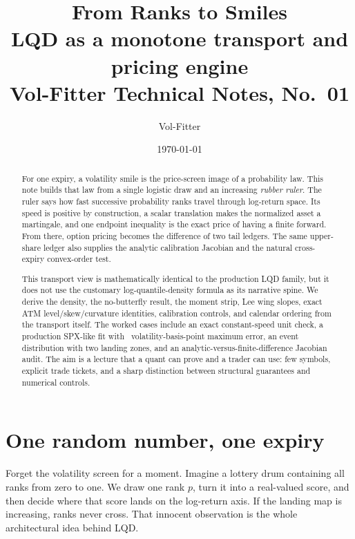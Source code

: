 \documentclass[11pt]{article}
\title{\textbf{From Ranks to Smiles}\\[2pt]
\large LQD as a monotone transport and pricing engine\\[2pt]
\normalsize Vol-Fitter Technical Notes, No.~01}
\author{Vol-Fitter}
\date{\today}
\begin{document}
\maketitle



\begin{abstract}
For one expiry, a volatility smile is the price-screen image of a probability
law.  This note builds that law from a single logistic draw and an increasing
\emph{rubber ruler}.  The ruler says how fast successive probability ranks
travel through log-return space.  Its speed is positive by construction, a
scalar translation makes the normalized asset a martingale, and one endpoint
inequality is the exact price of having a finite forward.  From there, option
pricing becomes the difference of two tail ledgers.  The same upper-share
ledger also supplies the analytic calibration Jacobian and the natural
cross-expiry convex-order test.

This transport view is mathematically identical to the production LQD family,
but it does not use the customary log-quantile-density formula as its narrative
spine.  We derive the density, the no-butterfly result, the moment strip, Lee
wing slopes, exact ATM level/skew/curvature identities, calibration controls,
and calendar ordering from the transport itself.  The worked cases include an
exact constant-speed unit check, a production SPX-like fit with
\lqdfreshspxmaxerr\ volatility-basis-point maximum error, an event distribution
with two landing zones, and an analytic-versus-finite-difference Jacobian
audit.  The aim is a lecture that a quant can prove and a trader can use: few
symbols, explicit trade tickets, and a sharp distinction between structural
guarantees and numerical controls.
\end{abstract}

\tableofcontents
\newpage

\section{One random number, one expiry}
\label{sec:one_draw}

Forget the volatility screen for a moment.  Imagine a lottery drum containing
all ranks from zero to one.  We draw one rank $p$, turn it into a real-valued
score, and then decide where that score lands on the log-return axis.  If the
landing map is increasing, ranks never cross.  That innocent observation is
the whole architectural idea behind LQD.
\end{document}
